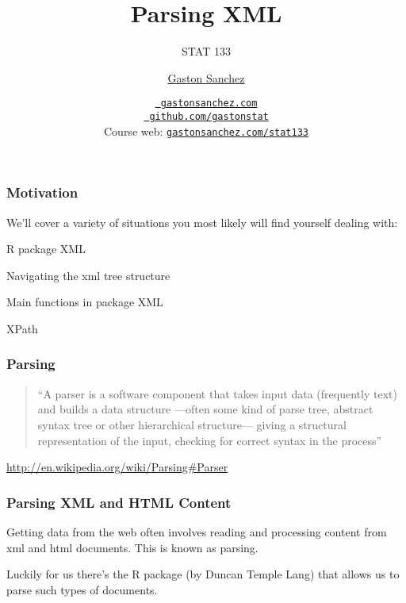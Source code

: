 \documentclass[12pt]{beamer}\usepackage[]{graphicx}\usepackage[]{color}
\title{Parsing XML}
\subtitle{STAT 133}
\author{\href{http://www.gastonsanchez.com}{Gaston Sanchez}}
\institute{Department of Statistics, UC{\textendash}Berkeley}
\date{\href{http://www.gastonsanchez.com}{\tt \scriptsize \color{foreground} gastonsanchez.com}
\\[-4pt]
\href{http://github.com/gastonstat}{\tt \scriptsize \color{foreground} github.com/gastonstat}
\\[-4pt]
{\scriptsize Course web: \href{http://www.gastonsanchez.com/stat133}{\tt gastonsanchez.com/stat133}}
}
\begin{document}
{
  \frame{
    \titlepage
  } 
}


\begin{frame}
\begin{center}
\Huge{}
\end{center}
\end{frame}


\begin{frame}
\frametitle{Motivation}

We'll cover a variety of situations you most likely will find yourself dealing with:
\bi
 \item R package XML
 \item Navigating the xml tree structure
 \item Main functions in package XML
 \item XPath
\ei
\eb

\end{frame}


\begin{frame}
\frametitle{Parsing}

\begin{quotation}
``A parser is a software component that takes input data (frequently text) and builds a data structure ---often some kind of parse tree, abstract syntax tree or other hierarchical structure--- giving a structural representation of the input, checking for correct syntax in the process''
\end{quotation}

{\footnotesize 
\url{http://en.wikipedia.org/wiki/Parsing\#Parser} \\
}

\end{frame}


\begin{frame}
\frametitle{Parsing XML and HTML Content}

Getting data from the web often involves reading and processing content from xml and html documents. This is known as parsing. 

\bigskip
Luckily for us there's the R package  (by Duncan Temple Lang) that allows us to parse such types of documents.
\eb

\end{frame}
\end{document}
